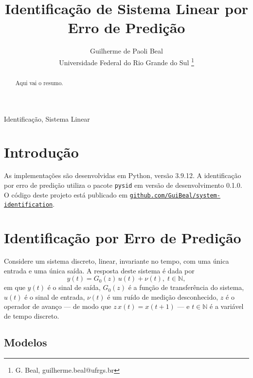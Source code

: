 \documentclass{ppgeesa}
\renewcommand{\Prod}{\,}
\begin{document}

\title{Identificação de Sistema Linear por Erro de Predição}
\author{Guilherme de Paoli Beal
  \\
  {\small Universidade Federal do Rio Grande do Sul}
  \thanks{G. Beal, guilherme.beal@ufrgs.br}
}
\maketitle
\thispagestyle{empty}\pagestyle{empty}

\begin{abstract}
  Aqui vai o resumo.
\end{abstract}

\begin{IEEEkeywords}
  Identificação, Sistema Linear
\end{IEEEkeywords}

\section{Introdução}


As implementações são desenvolvidas em Python, versão 3.9.12.
A identificação por erro de predição utiliza o pacote \texttt{pysid} em versão de desenvolvimento 0.1.0.
O código deste projeto está publicado em \href{https://github.com/GuiBeal/system-identification}{\texttt{github.com/GuiBeal/system-identification}}.

\section{Identificação por Erro de Predição}

Considere um sistema discreto, linear, invariante no tempo, com uma única entrada e uma única saída.
A resposta deste sistema é dada por
\begin{equation}\label{eq:system}
  y(t) = G_0(z) \Prod u(t) + \nu(t)
  ,\; t \in \mathbb{N}
  ,
\end{equation}
em que
$y(t)$ é o sinal de saída,
$G_0(z)$ é a função de transferência do sistema,
$u(t)$ é o sinal de entrada,
$\nu(t)$ é um ruído de medição desconhecido, %
$z$ é o operador de avanço --- de modo que $z \Prod x(t) = x(t+1)$ --- e
$t \in \mathbb{N}$ é a variável de tempo discreto.

\subsection{Modelos}
\end{document}
